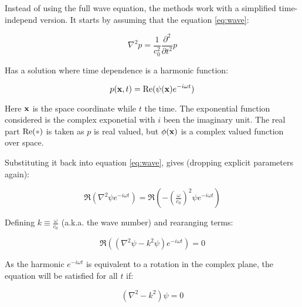 Instead of using the full wave equation, the methods work with a simplified
time-independ version. It starts by assuming that the equation
\ref{eq:wave}:

\[ \nabla^2 p = \frac{1}{c^2_0}\frac{\partial^2}{\partial t^2} p \]

Has a solution where time dependence is a harmonic function:

\[ p(\mathrm{\mathbf{x}},t) = \operatorname{Re}(\psi(\mathrm{\mathbf{x}})e^{-i\omega t}) \]

Here $\mathrm{\mathbf{x}}$ is the space coordinate while $t$ the time. The exponential function
considered is the complex exponetial with $i$ been the imaginary unit. The
real part $\Re(\parm)$ is taken as $p$ is real valued, but $\phi(\mathrm{\mathbf{x}})$ is a
complex valued function over space.

Substituting it back into equation \ref{eq:wave}, gives
(dropping explicit parameters again):

\[ \Re(\nabla^2 \psi e^{-i\omega t}) =
\Re(-(\tfrac{\omega}{c_0})^2 \psi e^{-i\omega t})\]


Defining $k \equiv \tfrac{\omega}{c_0} $ (a.k.a. the wave number) and rearanging
terms:

\[ \Re((\nabla^2 \psi -k^2 \psi) e^{-i\omega t}) = 0\]

As the harmonic $e^{-i\omega t}$ is equivalent to a rotation in the complex
plane, the equation will be satisfied for all $t$ if:

\begin{equation}
\label{eq:helmholtz}
(\nabla^2 -k^2)\psi = 0 
\end{equation}

% 
% 
% 
% 
% 
% 


